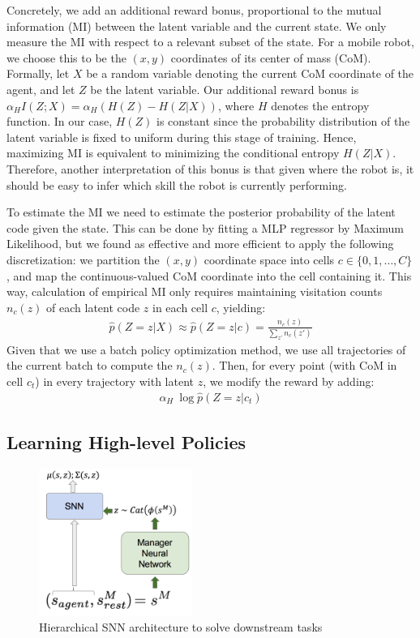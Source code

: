 \documentclass{article} %
\begin{document}
Concretely, we add an additional reward bonus, proportional to the mutual information (MI) between the latent variable and the current state. We only measure the MI with respect to a relevant subset of the state.
For a mobile robot, we choose this to be the $(x,y)$ coordinates of its center of mass (CoM). 
Formally, let $X$ be a random variable denoting the current CoM coordinate of the agent, and let $Z$ be the latent variable. Our additional reward bonus is $\alpha_H I(Z;X) = \alpha_H (H(Z) - H(Z|X))$, where $H$ denotes the entropy function. In our case, $H(Z)$ is constant since the probability distribution of the latent variable is fixed to uniform during this stage of training. Hence, maximizing MI is equivalent to minimizing the conditional entropy $H(Z|X)$. Therefore, another interpretation of this bonus is that given where the robot is, it should be easy to infer  which skill the robot is currently performing. 

To estimate the MI we need to estimate the posterior probability of the latent code given the state. This can be done by fitting a MLP regressor by Maximum Likelihood, but we found as effective and more efficient to apply the following discretization: we partition the $(x,y)$ coordinate space into cells $c\in\{0,1,\dots,C\}$, and map the continuous-valued CoM coordinate into the cell containing it. This way, calculation of empirical MI only requires maintaining visitation counts $n_c(z)$ of each latent code $z$ in each cell $c$, yielding:
\begin{align}
    \hat{p}(Z=z|X)\approx\hat{p}(Z=z|c)=\frac{n_c(z)}{\sum_{z'}n_c(z')}
\end{align}
Given that we use a batch policy optimization method, we use all trajectories of the current batch to compute the $n_c(z)$. Then, for every point (with CoM in cell $c_t$) in every trajectory with latent $z$, we modify the reward by adding:
\begin{align}
    \alpha_H~ \log\hat{p}(Z=z|c_t)
\end{align}


\subsection{Learning High-level Policies}
\label{section:method:highlevel}

\begin{figure}
\vspace{-40pt}
\includegraphics[width = 5cm]{Figures/hierarchical-SNN.png}
\caption{Hierarchical SNN architecture to solve downstream tasks}
\label{fig:hierarchical_snn_architecture}
\end{figure}
\end{document}
